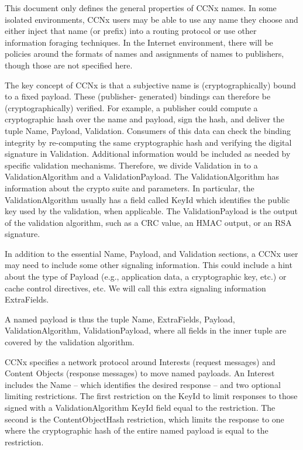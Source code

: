\documentclass[12pt]{report}
\begin{document}
This document only defines the general properties of CCNx names.  In
some isolated environments, CCNx users may be able to use any name
they choose and either inject that name (or prefix) into a routing
protocol or use other information foraging techniques.  In the
Internet environment, there will be policies around the formats of
names and assignments of names to publishers, though those are not
specified here.

The key concept of CCNx is that a subjective name is
(cryptographically) bound to a fixed payload.  These (publisher-
generated) bindings can therefore be (cryptographically) verified.
For example, a publisher could compute a cryptographic hash over the
name and payload, sign the hash, and deliver the tuple {Name,
Payload, Validation}.  Consumers of this data can check the binding
integrity by re-computing the same cryptographic hash and verifying
the digital signature in Validation.  Additional information would be
included as needed by specific validation mechanisms.  Therefore, we
divide Validation in to a ValidationAlgorithm and a
ValidationPayload.  The ValidationAlgorithm has information about the
crypto suite and parameters.  In particular, the ValidationAlgorithm
usually has a field called KeyId which identifies the public key used
by the validation, when applicable.  The ValidationPayload is the
output of the validation algorithm, such as a CRC value, an HMAC
output, or an RSA signature.

In addition to the essential Name, Payload, and Validation sections,
a CCNx user may need to include some other signaling information.
This could include a hint about the type of Payload (e.g.,
application data, a cryptographic key, etc.) or cache control
directives, etc.  We will call this extra signaling information
ExtraFields.

A named payload is thus the tuple {{Name, ExtraFields, Payload,
ValidationAlgorithm}, ValidationPayload}, where all fields in the
inner tuple are covered by the validation algorithm.

CCNx specifies a network protocol around Interests (request messages)
and Content Objects (response messages) to move named payloads.  An
Interest includes the Name -- which identifies the desired response
-- and two optional limiting restrictions.  The first restriction on
the KeyId to limit responses to those signed with a
ValidationAlgorithm KeyId field equal to the restriction.  The second
is the ContentObjectHash restriction, which limits the response to
one where the cryptographic hash of the entire named payload is equal
to the restriction.
\end{document}
